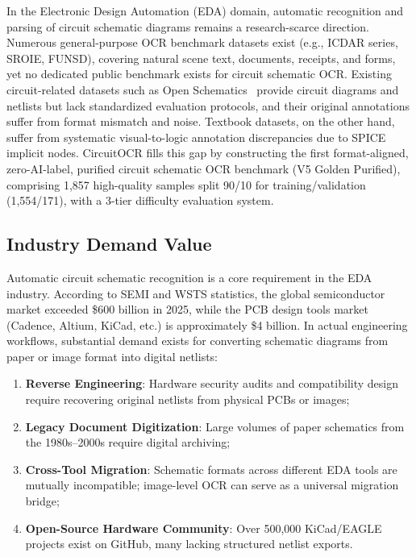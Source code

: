 In the Electronic Design Automation (EDA) domain, automatic recognition and parsing of circuit schematic diagrams remains a research-scarce direction. Numerous general-purpose OCR benchmark datasets exist (e.g., ICDAR series, SROIE, FUNSD), covering natural scene text, documents, receipts, and forms, yet no dedicated public benchmark exists for circuit schematic OCR. Existing circuit-related datasets such as Open Schematics~\citep{openschematics2025} provide circuit diagrams and netlists but lack standardized evaluation protocols, and their original annotations suffer from format mismatch and noise. Textbook datasets, on the other hand, suffer from systematic visual-to-logic annotation discrepancies due to SPICE implicit nodes. CircuitOCR fills this gap by constructing the first format-aligned, zero-AI-label, purified circuit schematic OCR benchmark (V5 Golden Purified), comprising 1,857 high-quality samples split 90/10 for training/validation (1,554/171), with a 3-tier difficulty evaluation system.

\subsection{Industry Demand Value}

Automatic circuit schematic recognition is a core requirement in the EDA industry. According to SEMI and WSTS statistics, the global semiconductor market exceeded \$600 billion in 2025, while the PCB design tools market (Cadence, Altium, KiCad, etc.) is approximately \$4 billion. In actual engineering workflows, substantial demand exists for converting schematic diagrams from paper or image format into digital netlists:

\begin{enumerate}[nosep]
    \item \textbf{Reverse Engineering}: Hardware security audits and compatibility design require recovering original netlists from physical PCBs or images;
    \item \textbf{Legacy Document Digitization}: Large volumes of paper schematics from the 1980s--2000s require digital archiving;
    \item \textbf{Cross-Tool Migration}: Schematic formats across different EDA tools are mutually incompatible; image-level OCR can serve as a universal migration bridge;
    \item \textbf{Open-Source Hardware Community}: Over 500,000 KiCad/EAGLE projects exist on GitHub, many lacking structured netlist exports.
\end{enumerate}

